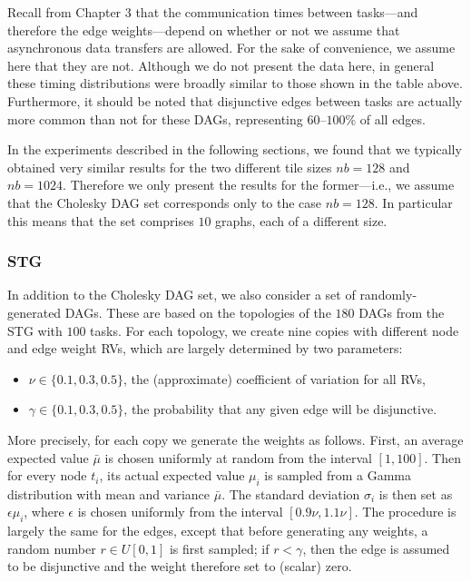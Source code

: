 \documentclass[12pt]{article}
\begin{document}
      Recall from Chapter 3 that the communication times between tasks---and therefore the edge weights---depend on whether or not we assume that asynchronous data transfers are allowed. For the sake of convenience, we assume here that they are not. Although we do not present the data here, in general these timing distributions were broadly similar to those shown in the table above. Furthermore, it should be noted that disjunctive edges between tasks are actually more common than not for these DAGs, representing $60$--$100\%$ of all edges.

      In the experiments described in the following sections, we found that we typically obtained very similar results for the two different tile sizes $nb = 128$ and $nb = 1024$. Therefore we only present the results for the former---i.e., we assume that the Cholesky DAG set corresponds only to the case $nb = 128$. In particular this means that the set comprises $10$ graphs, each of a different size.    
      
\subsubsection{STG}
\label{subsubsect.stg}

In addition to the Cholesky DAG set, we also consider a set of randomly-generated DAGs. These are based on the topologies of the $180$ DAGs from the STG with $100$ tasks. For each topology, we create nine copies with different node and edge weight RVs, which are largely determined by two parameters:
\begin{itemize}
\item $\nu \in \{ 0.1, 0.3, 0.5 \}$, the (approximate) coefficient of variation for all RVs,
  \item $\gamma \in \{ 0.1, 0.3, 0.5 \}$, the probability that any given edge will be disjunctive.
  \end{itemize}
  More precisely, for each copy we generate the weights as follows. First, an average expected value $\bar{\mu}$ is chosen uniformly at random from the interval $[1, 100]$. Then for every node $t_i$, its actual expected value $\mu_i$ is sampled from a Gamma distribution with mean and variance $\bar{\mu}$. The standard deviation $\sigma_i$ is then set as $\epsilon \mu_i$, where $\epsilon$ is chosen uniformly from the interval $[0.9\nu, 1.1\nu]$. The procedure is largely the same for the edges, except that before generating any weights, a random number $r \in U[0, 1]$ is first sampled; if $r < \gamma$, then the edge is assumed to be disjunctive and the weight therefore set to (scalar) zero.
\end{document}
